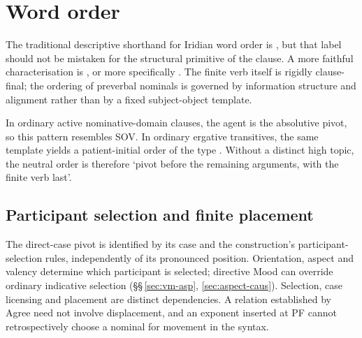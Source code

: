 \section{Word order}\label{sec:word-order}

The traditional descriptive shorthand for Iridian word order is , but
that label should not be mistaken for the structural primitive of the clause. A
more faithful characterisation is , or more
specifically . The finite verb itself is
rigidly clause-final; the ordering of preverbal nominals is governed by
information structure and alignment rather than by a fixed subject-object
template.

In ordinary active nominative-domain clauses, the agent is the absolutive
pivot, so this pattern resembles SOV. In ordinary ergative transitives,
the same template yields a patient-initial order of the type
. Without a distinct high topic, the neutral order is therefore
`pivot before the remaining arguments, with the finite verb last'.

\subsection{Participant selection and finite placement}
\label{sec:pivot-placement}

The direct-case pivot is identified by its case and the construction's
participant-selection rules, independently of its pronounced position.
Orientation, aspect and valency determine which participant is selected;
directive Mood can override ordinary indicative selection
(§§\,\ref{sec:vm-asp}, \ref{sec:aspect-caus}). Selection, case licensing and
placement are distinct dependencies. A relation established by Agree need not
involve displacement, and an exponent inserted at PF cannot retrospectively
choose a nominal for movement in the syntax.


